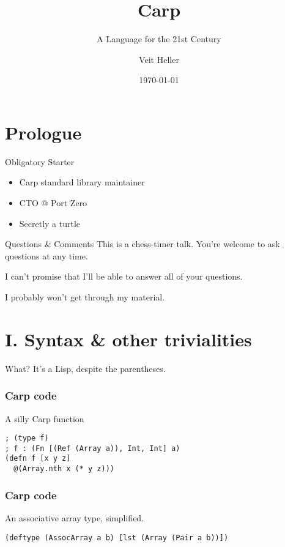 \documentclass[aspectratio=169]{beamer}
\title{Carp}
\subtitle{A Language for the 21st Century}
\date{\today}
\author{Veit Heller}
\institute{Port Zero}
\begin{document}
  \maketitle
  \section{Prologue}
  \begin{frame}{Obligatory Starter}
    \begin{itemize}
      \item Carp standard library maintainer
      \item CTO @ Port Zero
      \item Secretly a turtle
    \end{itemize}
  \end{frame}
  \begin{frame}{Questions \& Comments}
    This is a chess-timer talk. You’re welcome to ask questions at any time.
    \linebreak

    I can’t promise that I’ll be able to answer all of your questions.
    \linebreak

    I probably won’t get through my material.
  \end{frame}
  \section{I. Syntax \& other trivialities}
  \begin{frame}{What?}
    It’s a Lisp, despite the parentheses.
  \end{frame}
  \begin{frame}[fragile]
  \frametitle{Carp code}
    \begin{listing}[H]
      \caption{A silly Carp function}
      \begin{verbatim}
; (type f)
; f : (Fn [(Ref (Array a)), Int, Int] a)
(defn f [x y z]
  @(Array.nth x (* y z)))
      \end{verbatim}
    \end{listing}
  \end{frame}
  \begin{frame}[fragile]
    \frametitle{Carp code}
    \begin{listing}[H]
      \caption{An associative array type, simplified.}
      \begin{verbatim}
(deftype (AssocArray a b) [lst (Array (Pair a b))])
      \end{verbatim}
    \end{listing}
  \end{frame}
\end{document}
